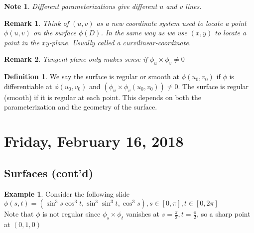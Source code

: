 \documentclass[12pt]{article}
\theoremstyle{plain}
\newtheorem*{remark}{Remark}
\newtheorem*{note}{Note}
\theoremstyle{definition}
\newtheorem{definition}[theorem]{Definition}
\newtheorem{example}[theorem]{Example}
\begin{document}
\begin{note}
	Different parameterizations give different $u$ and $v$ lines.
\end{note}

\begin{remark}
	Think of $(u,v)$ as a new coordinate system used to locate a point $\phi (u,v)$ on the surface $\phi (D)$. In the same way as we use $(x,y)$ to locate a point in the $xy$-plane. Usually called a curvilinear-coordinate.
\end{remark}

\begin{remark}
	Tangent plane only makes sense if $\phi_u \times \phi_v \neq 0$
\end{remark}

\begin{definition}
	We say the surface is regular or smooth at $\phi (u_0, v_0)$ if $\phi$ is differentiable at $\phi (u_0, v_0)$ and $(\phi_u \times \phi_v (u_0, v_0)) \neq 0$. The surface is regular (smooth) if it is regular at each point. This depends on both the parameterization and the geometry of the surface.
\end{definition}

\newpage

\section{Friday, February 16, 2018}

\subsection{Surfaces (cont'd)}

\begin{example}
	Consider the following slide\\
	$\phi (s,t) = (\sin^3 s \cos^3 t, \sin^3 \sin^3 t, \cos^3 s), s \in [0,\pi], t\in [0,2\pi]$\\
	Note that $\phi$ is not regular since  $\phi_s \times \phi_t$ vanishes at $s=\frac{\pi}{2}, t=\frac{\pi}{2}$, so a sharp point at $(0,1,0)$
\end{example}
\end{document}
